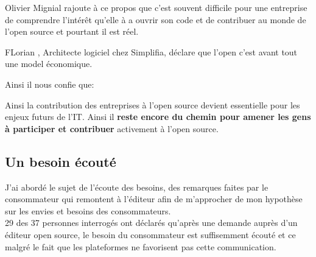 			Olivier Mignial rajoute à ce propos que c'est souvent difficile pour une entreprise de comprendre l'intérêt qu'elle à a ouvrir son code et de contribuer au monde de l'open source et pourtant il est réel.

			\begin{center}
				\textit{
				}
			\end{center}

			FLorian , Architecte logiciel chez Simplifia, déclare que l'open c'est avant tout une model économique.

			Ainsi il nous confie que:

						\begin{center}
				\textit{
				}
			\end{center}

			Ainsi la contribution des entreprises à l'open source devient essentielle pour les enjeux futurs de l'IT.
			Ainsi il \textbf{reste encore du chemin pour amener les gens à participer et contribuer} activement à l'open source.

		\subsection{Un besoin écouté}

			J'ai abordé le sujet de l'écoute des besoins, des remarques faites par le consommateur qui remontent à l'éditeur afin de m'approcher de mon hypothèse sur les envies et besoins des consommateurs.\\

			29 des 37 personnes interrogés ont déclarés qu'après une demande auprès d'un éditeur open source, le besoin du consommateur est suffisemment écouté et ce malgré le fait que les plateformes ne favorisent pas cette communication.

